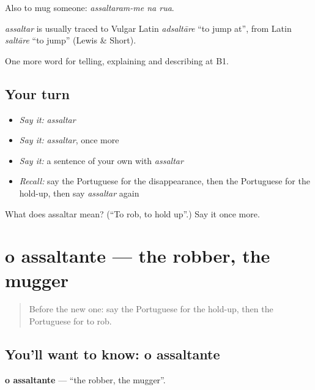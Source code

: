 Also to mug someone: \emph{assaltaram-me na rua}.

\begin{cousinweb}
\emph{assaltar} is usually traced to Vulgar Latin \emph{adsaltāre} \textquotedblleft{}to jump at\textquotedblright{}, from Latin \emph{saltāre} \textquotedblleft{}to jump\textquotedblright{} (Lewis \& Short).
\end{cousinweb}

\begin{grammarlens}[title={What you've built}]
One more word for telling, explaining and describing at B1.
\end{grammarlens}

\subsection*{Your turn}
\begin{itemize}
\raggedright
  \item \emph{Say it:} \emph{assaltar}
  \item \emph{Say it:} \emph{assaltar}, once more
  \item \emph{Say it:} a sentence of your own with \emph{assaltar}
  \item \emph{Recall:} say the Portuguese for the disappearance, then the Portuguese for the hold-up, then say \emph{assaltar} again
\end{itemize}

\begin{tcolorbox}[breakable,colback=teal!4,colframe=teal!35!black,title={Before you move on}]
What does assaltar mean? (\textquotedblleft{}To rob, to hold up\textquotedblright{}.) Say it once more.
\end{tcolorbox}
\section[o assaltante]{o assaltante — the robber, the mugger}

\label{lesson:PT-C288-assaltante}



\begin{quote}
Before the new one: say the Portuguese for the hold-up, then the Portuguese for to rob.
\end{quote}

\subsection*{You'll want to know: o assaltante}
\textbf{o assaltante} — \textquotedblleft{}the robber, the mugger\textquotedblright{}.

